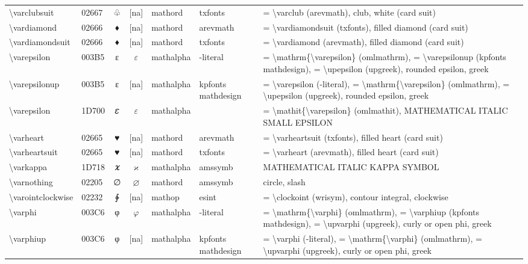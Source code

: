\documentclass[a4paper,landscape]{article}
\begin{document}
\begin{longtable}{llcclll}
\textbackslash{}varclubsuit & 02667 & ♧ & [na] & mathord & txfonts & = \textbackslash{}varclub (arevmath), club, white (card suit) \\
\textbackslash{}vardiamond & 02666 & ♦ & [na] & mathord & arevmath & = \textbackslash{}vardiamondsuit (txfonts),  filled diamond (card suit) \\
\textbackslash{}vardiamondsuit & 02666 & ♦ & [na] & mathord & txfonts & = \textbackslash{}vardiamond (arevmath), filled diamond (card suit) \\
\textbackslash{}varepsilon & 003B5 & ε & $\varepsilon$ & mathalpha & -literal & = \textbackslash{}mathrm\{\textbackslash{}varepsilon\} (omlmathrm), = \textbackslash{}varepsilonup (kpfonts mathdesign), = \textbackslash{}upepsilon (upgreek), rounded epsilon, greek \\
\textbackslash{}varepsilonup & 003B5 & ε & [na] & mathalpha & kpfonts mathdesign & = \textbackslash{}varepsilon (-literal), = \textbackslash{}mathrm\{\textbackslash{}varepsilon\} (omlmathrm),  = \textbackslash{}upepsilon (upgreek),  rounded epsilon,  greek \\
\textbackslash{}varepsilon & 1D700 & 𝜀 & $\varepsilon$ & mathalpha &  & = \textbackslash{}mathit\{\textbackslash{}varepsilon\} (omlmathit), MATHEMATICAL ITALIC SMALL EPSILON \\
\textbackslash{}varheart & 02665 & ♥ & [na] & mathord & arevmath & = \textbackslash{}varheartsuit (txfonts),  filled heart (card suit) \\
\textbackslash{}varheartsuit & 02665 & ♥ & [na] & mathord & txfonts & = \textbackslash{}varheart (arevmath), filled heart (card suit) \\
\textbackslash{}varkappa & 1D718 & 𝜘 & $\varkappa$ & mathalpha & amssymb & MATHEMATICAL ITALIC KAPPA SYMBOL \\
\textbackslash{}varnothing & 02205 & ∅ & $\varnothing$ & mathord & amssymb & circle, slash \\
\textbackslash{}varointclockwise & 02232 & ∲ & [na] & mathop & esint & = \textbackslash{}clockoint (wrisym), contour integral, clockwise \\
\textbackslash{}varphi & 003C6 & φ & $\varphi$ & mathalpha & -literal & = \textbackslash{}mathrm\{\textbackslash{}varphi\} (omlmathrm), = \textbackslash{}varphiup (kpfonts mathdesign), = \textbackslash{}upvarphi (upgreek), curly or open phi, greek \\
\textbackslash{}varphiup & 003C6 & φ & [na] & mathalpha & kpfonts mathdesign & = \textbackslash{}varphi (-literal), = \textbackslash{}mathrm\{\textbackslash{}varphi\} (omlmathrm),  = \textbackslash{}upvarphi (upgreek),  curly or open phi,  greek \\

\end{longtable}
\end{document}
